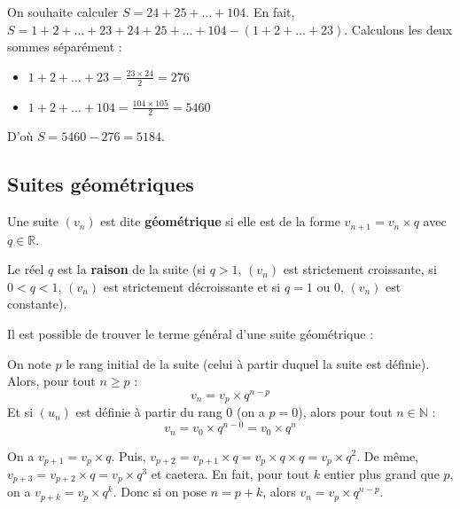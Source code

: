 	\begin{tip}[Exemple]
		On souhaite calculer $S = 24 + 25 + \dots + 104$.
		\newpar
		En fait, $S = 1 + 2 + \dots + 23 + 24 + 25 + \dots + 104 - (1 + 2 + \dots + 23)$. Calculons les deux sommes séparément :
		\begin{itemize}
			\item $1 + 2 + \dots + 23 = \frac{23 \times 24}{2} = 276$
			\item $1 + 2 + \dots + 104 = \frac{104 \times 105}{2} = 5460$
		\end{itemize}
		D'où $S = 5460 - 276 = 5184$.
	\end{tip}
	
	\subsection{Suites géométriques}
	
	\begin{formula}[Définition]
		Une suite $(v_n)$ est dite \textbf{géométrique} si elle est de la forme $v_{n+1} = v_n \times q$ avec $q \in \mathbb{R}$.
	\end{formula}
	
	\begin{formula}[Raison]
		Le réel $q$ est la \textbf{raison} de la suite (si $q > 1$, $(v_n)$ est strictement croissante, si $0 < q < 1$, $(v_n)$ est strictement décroissante et si $q = 1$ ou $0$, $(v_n)$ est constante).
	\end{formula}
	
	Il est possible de trouver le terme général d'une suite géométrique :
	
	\begin{formula}
		On note $p$ le rang initial de la suite (celui à partir duquel la suite est définie). Alors, pour tout $n \geq p$ :
		\[ v_n = v_p \times q^{n-p} \]
		Et si $(u_n)$ est définie à partir du rang $0$ (on a $p = 0$), alors pour tout $n \in \mathbb{N}$ :
		\[ v_n = v_0 \times q^{n-0} = v_0 \times q^n \]
	\end{formula}
	
	\begin{demonstration}
		On a $v_{p+1} = v_p \times q$. Puis, $v_{p+2} = v_{p+1} \times q = v_p \times q \times q = v_p \times q^2$. De même, $v_{p+3} = v_{p+2} \times q = v_p \times q^3$  et caetera.
		\newline
		En fait, pour tout $k$ entier plus grand que $p$, on a $v_{p+k} = v_p \times q^k$.
		\newline
		Donc si on pose $n = p+k$, alors $v_n = v_p \times q^{n-p}$.
	\end{demonstration}
	

